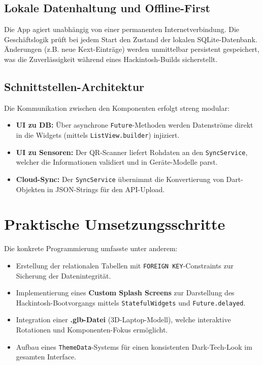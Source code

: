 \subsection{Lokale Datenhaltung und Offline-First}
Die App agiert unabhängig von einer permanenten Internetverbindung. Die Geschäftslogik prüft bei jedem Start den Zustand der lokalen SQLite-Datenbank. Änderungen (z.B. neue Kext-Einträge) werden unmittelbar persistent gespeichert, was die Zuverlässigkeit während eines Hackintosh-Builds sicherstellt.

\subsection{Schnittstellen-Architektur}
Die Kommunikation zwischen den Komponenten erfolgt streng modular:
\begin{itemize}
    \item \textbf{UI zu DB:} Über asynchrone \texttt{Future}-Methoden werden Datenströme direkt in die Widgets (mittels \texttt{ListView.builder}) injiziert.
    \item \textbf{UI zu Sensoren:} Der QR-Scanner liefert Rohdaten an den \texttt{SyncService}, welcher die Informationen validiert und in Geräte-Modelle parst.
    \item \textbf{Cloud-Sync:} Der \texttt{SyncService} übernimmt die Konvertierung von Dart-Objekten in JSON-Strings für den API-Upload.
\end{itemize}

\section{Praktische Umsetzungsschritte}
Die konkrete Programmierung umfasste unter anderem:
\begin{itemize}
    \item Erstellung der relationalen Tabellen mit \texttt{FOREIGN KEY}-Constraints zur Sicherung der Datenintegrität.
    \item Implementierung eines \textbf{Custom Splash Screens} zur Darstellung des Hackintosh-Bootvorgangs mittels \texttt{StatefulWidgets} und \texttt{Future.delayed}.
    \item Integration einer \textbf{.glb-Datei} (3D-Laptop-Modell), welche interaktive Rotationen und Komponenten-Fokus ermöglicht.
    \item Aufbau eines \texttt{ThemeData}-Systems für einen konsistenten Dark-Tech-Look im gesamten Interface.
\end{itemize}

